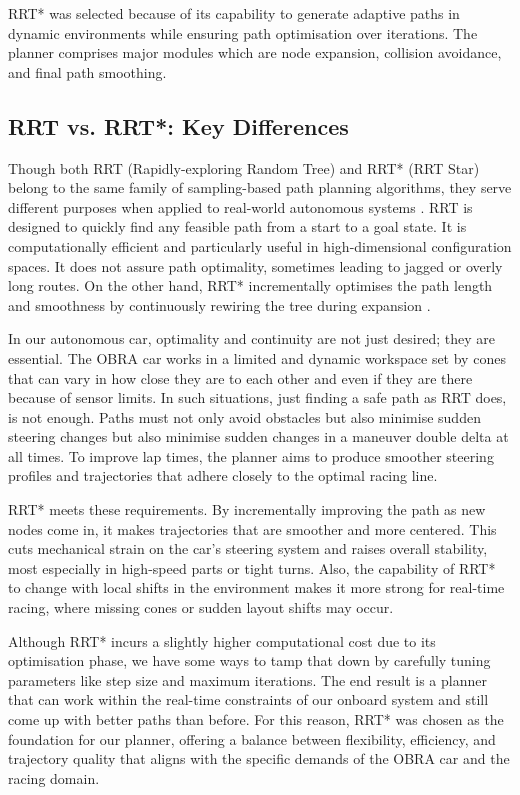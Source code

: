 \documentclass[a4paper,11pt]{report}
\begin{document}
RRT* was selected because of its capability to generate adaptive paths in dynamic
environments while ensuring path optimisation over iterations. The planner
comprises major modules which are node expansion, collision avoidance, and
final path smoothing.

\subsection{RRT vs. RRT*: Key Differences}

Though both RRT (Rapidly-exploring Random Tree) and RRT* (RRT Star)
belong to the same family of sampling-based path planning algorithms,
they serve different purposes when applied to real-world autonomous systems \cite{reference1, reference3}.
RRT is designed to quickly find any feasible path from a start to a goal state.
It is computationally efficient and particularly useful in high-dimensional configuration spaces.
It does not assure path optimality, sometimes leading to jagged or overly long routes.
On the other hand, RRT* incrementally optimises the path length and smoothness by continuously rewiring the tree during expansion \cite{reference4}.

In our autonomous car, optimality and continuity are not just desired; they are essential.
The OBRA car works in a limited and dynamic workspace set by cones that can vary in how close
they are to each other and even if they are there because of sensor limits. In such situations, just finding a safe path as RRT does, is not enough.
Paths must not only avoid obstacles but also minimise sudden steering changes but also minimise sudden
changes in a maneuver double delta at all times.
To improve lap times, the planner aims to produce smoother steering profiles and trajectories that 
adhere closely to the optimal racing line.

RRT* meets these requirements. By incrementally improving the path as new nodes come in, it makes
trajectories that are smoother and more centered. This cuts mechanical strain on the car's steering
system and raises overall stability, most especially in high-speed parts or tight turns. Also, the
capability of RRT* to change with local shifts in the environment makes it more strong for
real-time racing, where missing cones or sudden layout shifts may occur.

Although RRT* incurs a slightly higher computational cost due to its optimisation phase, 
we have some ways to tamp that down by carefully tuning parameters like step size
and maximum iterations. The end result is a planner that can work within the real-time
constraints of our onboard system and still come up with better paths than before. For
this reason, RRT* was chosen as the foundation
for our planner, offering a balance between flexibility, efficiency, and trajectory quality that
aligns with the specific demands of the OBRA car and the racing domain.
\end{document}
